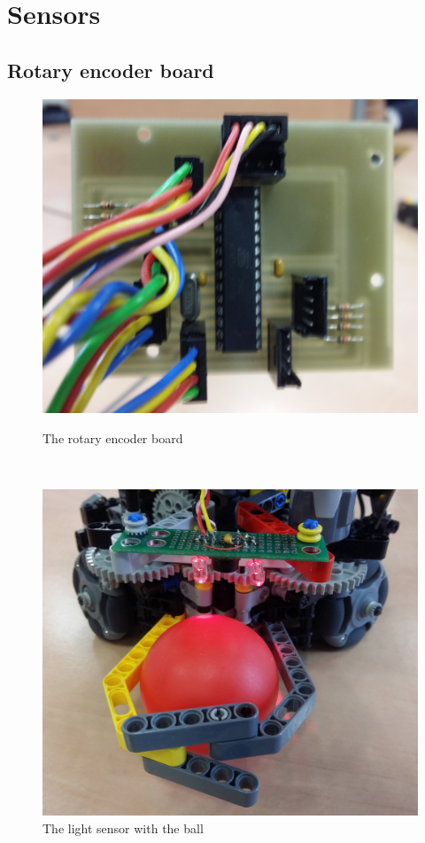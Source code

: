 \documentclass[a4paper,12pt]{article}
\begin{document}
\section{Sensors}
\subsection{Rotary encoder board}

\begin{figure}[ht!]
	\begin{minipage}[b]{.49\textwidth}
        \centering
\includegraphics[scale=.12]{rotary1}
\caption{The rotary encoder board}
\label{fig:rotary}
	\end{minipage}
	~
	\begin{minipage}[b]{.48\textwidth}
        \centering
\includegraphics[scale=.1335]{sensor3}
\caption{The light sensor with the ball}
\label{fig:sensor}
	\end{minipage}
\end{figure}
\end{document}
